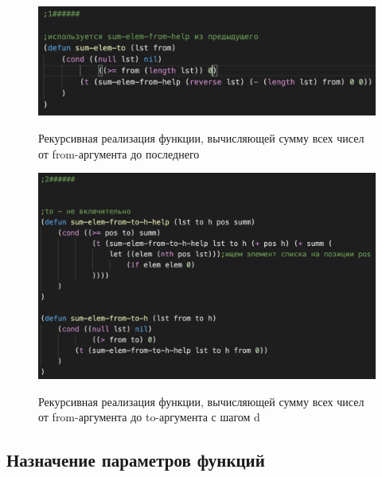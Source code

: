 \documentclass[a4paper,12pt]{article}
\begin{document}
  	\begin{figure}[h!]
 	\begin{center}
 		{\includegraphics[scale = 0.9]{6.12.1.png}}
 		\label{ris:6.12.1}
 	\end{center}
 \caption{Рекурсивная реализация функции, вычисляющей сумму всех чисел от from-аргумента до последнего}
 \end{figure}

	\newpage
 
  	\begin{figure}[h!]
 	\begin{center}
 		{\includegraphics[scale = 0.8]{6.12.2.png}}
 		\label{ris:6.12.2}
 	\end{center}
 \caption{Рекурсивная реализация функции, вычисляющей сумму всех чисел от from-аргумента до to-аргумента с шагом d}
 \end{figure}
 
 	
 	\subsection*{Назначение параметров функций}
 	
\end{document}
